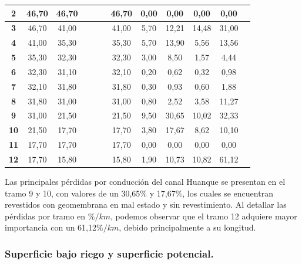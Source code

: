 \documentclass[]{article}
\begin{document}
\begin{landscape}
\begin{table}[H]
{\begin{tabular}{|c|c|c|c|c|c|c|c|c|c|c|c|}
{\color[HTML]{FE0000} \textbf{2}} & {\color[HTML]{FE0000} \textbf{46,70}} & {\color[HTML]{FE0000} \textbf{46,70}} & & & & {\color[HTML]{FE0000} \textbf{46,70}} & {\color[HTML]{FE0000} \textbf{0,00}} & {\color[HTML]{FE0000} \textbf{0,00}} & {\color[HTML]{FE0000} \textbf{0,00}}  &  {\color[HTML]{FE0000} \textbf{0,00}}  \\ \hline 
\textbf{3} & 46,70 & 41,00 & & & & 41,00 & 5,70 & 12,21 & 14,48 & 31,00  \\ \hline
\textbf{4} & 41,00 & 35,30 & & & & 35,30 & 5,70 & 13,90 & 5,56 & 13,56  \\ \hline
\textbf{5} & 35,30 & 32,30 & & & & 32,30 & 3,00 & 8,50 & 1,57 & 4,44  \\ \hline
\textbf{6} & 32,30 & 31,10 & & & & 32,10 & 0,20 & 0,62 & 0,32 & 0,98  \\ \hline
\textbf{7} & 32,10 & 31,80 & & & & 31,80 & 0,30 & 0,93 & 0,60 & 1,88  \\ \hline
\textbf{8} & 31,80 & 31,00 & & & & 31,00 & 0,80 & 2,52 & 3,58 & 11,27  \\ \hline
\textbf{9} & 31,00 & 21,50 & & & & 21,50 & 9,50 & 30,65 & 10,02 & 32,33  \\ \hline
\textbf{10} & 21,50 & 17,70 & & & & 17,70 & 3,80 & 17,67 & 8,62 & 10,10  \\ \hline
\textbf{11} & 17,70 & 17,70 & & & & 17,70 & 0,00 & 0,00 & 0,00 & 0,00  \\ \hline
\textbf{12} & 17,70 & 15,80 & & & & 15,80 & 1,90 & 10,73 & 10,82 & 61,12  \\ \hline
\end{tabular}
}
\end{table}
\end{landscape}
Las principales pérdidas por conducción del canal Huanque se presentan en el tramo 9 y 10, con valores de un 30,65$\%$ y 17,67$\%$, los cuales se encuentran revestidos con geomembrana en mal estado y sin revestimiento. Al detallar las pérdidas por tramo en $\%/km$, podemos observar que el tramo 12 adquiere mayor importancia con un 61,12$\%/km$, debido principalmente a su longitud.

\subsubsection{Superficie bajo riego y superficie potencial.}
\end{document}
